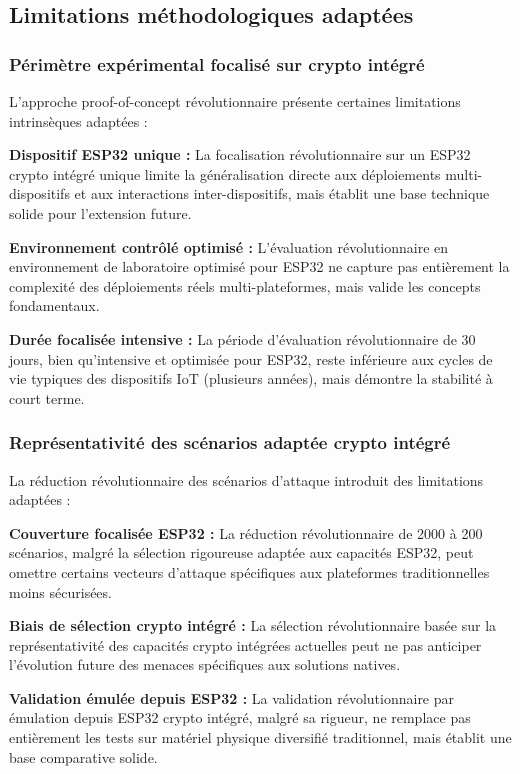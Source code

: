 \subsection{Limitations méthodologiques adaptées}

\subsubsection{Périmètre expérimental focalisé sur crypto intégré}

L'approche proof-of-concept révolutionnaire présente certaines limitations intrinsèques adaptées :

\textbf{Dispositif ESP32 unique :} La focalisation révolutionnaire sur un ESP32 crypto intégré unique limite la généralisation directe aux déploiements multi-dispositifs et aux interactions inter-dispositifs, mais établit une base technique solide pour l'extension future.

\textbf{Environnement contrôlé optimisé :} L'évaluation révolutionnaire en environnement de laboratoire optimisé pour ESP32 ne capture pas entièrement la complexité des déploiements réels multi-plateformes, mais valide les concepts fondamentaux.

\textbf{Durée focalisée intensive :} La période d'évaluation révolutionnaire de 30 jours, bien qu'intensive et optimisée pour ESP32, reste inférieure aux cycles de vie typiques des dispositifs IoT (plusieurs années), mais démontre la stabilité à court terme.

\subsubsection{Représentativité des scénarios adaptée crypto intégré}

La réduction révolutionnaire des scénarios d'attaque introduit des limitations adaptées :

\textbf{Couverture focalisée ESP32 :} La réduction révolutionnaire de 2000 à 200 scénarios, malgré la sélection rigoureuse adaptée aux capacités ESP32, peut omettre certains vecteurs d'attaque spécifiques aux plateformes traditionnelles moins sécurisées.

\textbf{Biais de sélection crypto intégré :} La sélection révolutionnaire basée sur la représentativité des capacités crypto intégrées actuelles peut ne pas anticiper l'évolution future des menaces spécifiques aux solutions natives.

\textbf{Validation émulée depuis ESP32 :} La validation révolutionnaire par émulation depuis ESP32 crypto intégré, malgré sa rigueur, ne remplace pas entièrement les tests sur matériel physique diversifié traditionnel, mais établit une base comparative solide.

